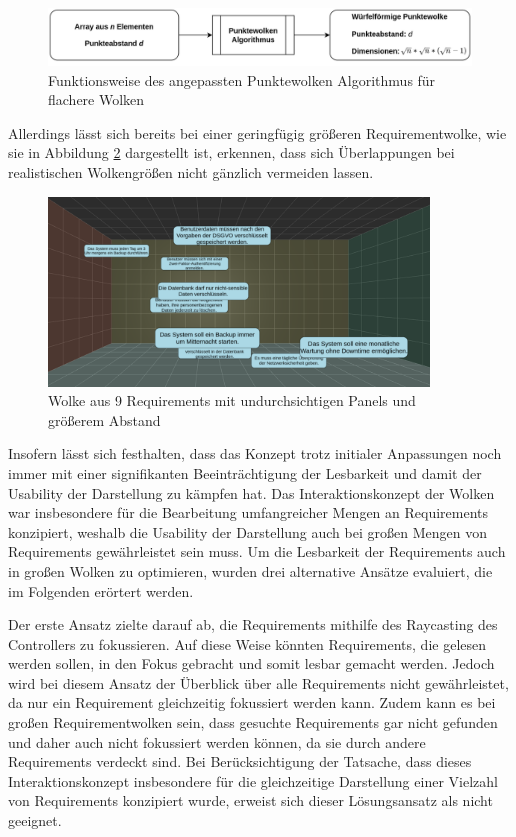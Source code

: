 \begin{figure}[H]
    \centering
    \includegraphics[width=1\textwidth]{images/WolkenAlgoAngepasst.png}
    \caption{Funktionsweise des angepassten Punktewolken Algorithmus für flachere Wolken}
    \label{fig:wolken-algo-ang}
\end{figure}

\newpage

Allerdings lässt sich bereits bei einer geringfügig größeren Requirementwolke, wie sie in Abbildung \ref{fig:wolken-prototyp-3} dargestellt ist, erkennen, dass sich Überlappungen bei realistischen Wolkengrößen nicht gänzlich vermeiden lassen. 

\begin{figure}[H]
    \centering
    \includegraphics[width=0.9\textwidth]{images/WolkenPrototyp3.png}
    \caption{Wolke aus 9 Requirements mit undurchsichtigen Panels und größerem Abstand}
    \label{fig:wolken-prototyp-3}
\end{figure}

Insofern lässt sich festhalten, dass das Konzept trotz initialer Anpassungen noch immer mit einer signifikanten Beeinträchtigung der Lesbarkeit und damit der Usability der Darstellung zu kämpfen hat.
Das Interaktionskonzept der Wolken war insbesondere für die Bearbeitung umfangreicher Mengen an Requirements konzipiert, weshalb die Usability der Darstellung auch bei großen Mengen von Requirements gewährleistet sein muss.
Um die Lesbarkeit der Requirements auch in großen Wolken zu optimieren, wurden drei alternative Ansätze evaluiert, die im Folgenden erörtert werden.

Der erste Ansatz zielte darauf ab, die Requirements mithilfe des Raycasting des Controllers zu fokussieren.
Auf diese Weise könnten Requirements, die gelesen werden sollen, in den Fokus gebracht und somit lesbar gemacht werden.
Jedoch wird bei diesem Ansatz der Überblick über alle Requirements nicht gewährleistet, da nur ein Requirement gleichzeitig fokussiert werden kann.
Zudem kann es bei großen Requirementwolken sein, dass gesuchte Requirements gar nicht gefunden und daher auch nicht fokussiert werden können, da sie durch andere Requirements verdeckt sind.
Bei Berücksichtigung der Tatsache, dass dieses Interaktionskonzept insbesondere für die gleichzeitige Darstellung einer Vielzahl von Requirements konzipiert wurde, erweist sich dieser Lösungsansatz als nicht geeignet.

